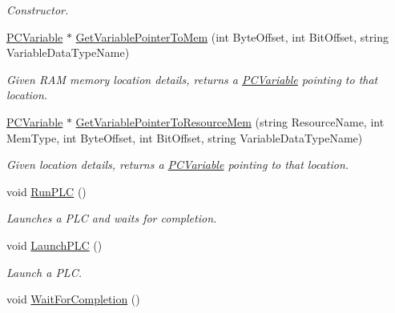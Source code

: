 \begin{DoxyCompactItemize}
\begin{DoxyCompactList}\small\item\em Constructor. \end{DoxyCompactList}\item 
\hyperlink{classpc__emulator_1_1PCVariable}{P\+C\+Variable} $\ast$ \hyperlink{classpc__emulator_1_1PCConfigurationImpl_ae083ff203d78246a9c2ea8f3d8ec20a8}{Get\+Variable\+Pointer\+To\+Mem} (int Byte\+Offset, int Bit\+Offset, string Variable\+Data\+Type\+Name)
\begin{DoxyCompactList}\small\item\em Given R\+AM memory location details, returns a \hyperlink{classpc__emulator_1_1PCVariable}{P\+C\+Variable} pointing to that location. \end{DoxyCompactList}\item 
\hyperlink{classpc__emulator_1_1PCVariable}{P\+C\+Variable} $\ast$ \hyperlink{classpc__emulator_1_1PCConfigurationImpl_ae09c2ded1759b34e1ea304f715c74fe3}{Get\+Variable\+Pointer\+To\+Resource\+Mem} (string Resource\+Name, int Mem\+Type, int Byte\+Offset, int Bit\+Offset, string Variable\+Data\+Type\+Name)
\begin{DoxyCompactList}\small\item\em Given location details, returns a \hyperlink{classpc__emulator_1_1PCVariable}{P\+C\+Variable} pointing to that location. \end{DoxyCompactList}\item 
void \hyperlink{classpc__emulator_1_1PCConfigurationImpl_a7720a1df058b8f2c65b42a61ee0ccce8}{Run\+P\+LC} ()\hypertarget{classpc__emulator_1_1PCConfigurationImpl_a7720a1df058b8f2c65b42a61ee0ccce8}{}\label{classpc__emulator_1_1PCConfigurationImpl_a7720a1df058b8f2c65b42a61ee0ccce8}

\begin{DoxyCompactList}\small\item\em Launches a P\+LC and waits for completion. \end{DoxyCompactList}\item 
void \hyperlink{classpc__emulator_1_1PCConfigurationImpl_a6bc0a2d0db10cd899baac75d7d79f33f}{Launch\+P\+LC} ()\hypertarget{classpc__emulator_1_1PCConfigurationImpl_a6bc0a2d0db10cd899baac75d7d79f33f}{}\label{classpc__emulator_1_1PCConfigurationImpl_a6bc0a2d0db10cd899baac75d7d79f33f}

\begin{DoxyCompactList}\small\item\em Launch a P\+LC. \end{DoxyCompactList}\item 
void \hyperlink{classpc__emulator_1_1PCConfigurationImpl_a710983b0fa5c90e9d98d42b5cffda7bd}{Wait\+For\+Completion} ()\hypertarget{classpc__emulator_1_1PCConfigurationImpl_a710983b0fa5c90e9d98d42b5cffda7bd}{}\label{classpc__emulator_1_1PCConfigurationImpl_a710983b0fa5c90e9d98d42b5cffda7bd}


\end{DoxyCompactItemize}
